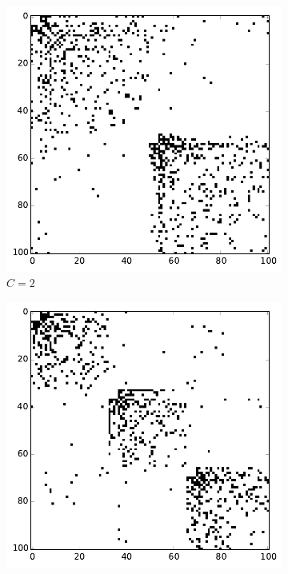 \begin{figure}[h]
        \centering
        \begin{subfigure}[b]{0.3\textwidth}
        	\centering
                \includegraphics[width=\textwidth]{images/topology/hierarchical_adjacency_2_dot1.pdf}
                \caption{$C=2$}
        \end{subfigure}
        \begin{subfigure}[b]{0.3\textwidth}
        	\centering
                \includegraphics[width=\textwidth]{images/topology/hierarchical_adjacency_3_dot1.pdf}

\end{subfigure}
\end{figure}
